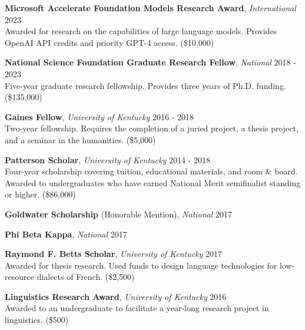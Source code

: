 \documentclass[10pt]{article}
\newcommand{\halfblankline}{\quad\vspace{-0.5\baselineskip}\pagebreak[3]}
\begin{document}
	\halfblankline

	\textbf{Microsoft Accelerate Foundation Models Research Award}, \textit{International}
	\hfill 2023\\
		Awarded for research on the capabilities of large language models. Provides OpenAI API credits and priority GPT-4 access. (\$10,000) 

	\halfblankline
	
	\textbf{National Science Foundation Graduate Research Fellow}, \textit{National}
	\hfill 2018 - 2023\\
		Five-year graduate research fellowship. Provides three years of Ph.D. funding. (\$135,000)
	
	\halfblankline
	
	\textbf{Gaines Fellow}, \textit{University of Kentucky}
	\hfill 2016 - 2018\\
		Two-year fellowship. Requires the completion of a juried project, a thesis project, and a seminar in the humanities. (\$5,000)
	
	\halfblankline

	\textbf{Patterson Scholar}, \textit{University of Kentucky}
	\hfill 2014 - 2018\\
		Four-year scholarship covering tuition, educational materials, and room \& board. Awarded to undergraduates who have earned National Merit semifinalist standing or higher. (\$86,000)

	\halfblankline

	\textbf{Goldwater Scholarship} (Honorable Mention), \textit{National}
	\hfill 2017
	
	\halfblankline
	
	\textbf{Phi Beta Kappa}, \textit{National}
	\hfill 2017

	\halfblankline
	
	\textbf{Raymond F. Betts Scholar}, \textit{University of Kentucky}
	\hfill 2017\\
		Awarded for thesis research. Used funds to design language technologies for low-resource
		dialects of French. (\$2,500)

	\halfblankline

	\textbf{Linguistics Research Award}, \textit{University of Kentucky}
	\hfill 2016\\
		Awarded to an undergraduate to facilitate a year-long
		research project in linguistics. (\$500)

	
\end{document}
